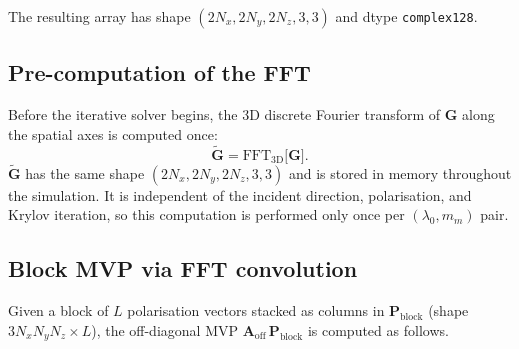 \documentclass[11pt,a4paper]{article}
\begin{document}
The resulting array has shape
$(2N_x, 2N_y, 2N_z, 3, 3)$ and dtype \texttt{complex128}.

\subsection{Pre-computation of the FFT}
\label{sec:fft-precompute}

Before the iterative solver begins, the 3D discrete Fourier transform of
$\mathbf{G}$ along the spatial axes is computed once:
\begin{equation}
  \widetilde{\mathbf{G}}
    = \mathrm{FFT}_{3\text{D}}\!\bigl[\mathbf{G}\bigr].
  \label{eq:fft-precompute}
\end{equation}
$\widetilde{\mathbf{G}}$ has the same shape
$(2N_x, 2N_y, 2N_z, 3, 3)$ and is stored in memory throughout the
simulation.
It is independent of the incident direction, polarisation, and Krylov
iteration, so this computation is performed only once per
$(\lambda_0, m_m)$ pair.

\subsection{Block MVP via FFT convolution}
\label{sec:fft-mvp}

Given a block of $L$ polarisation vectors stacked as columns in
$\mathbf{P}_{\text{block}}$ (shape $3N_xN_yN_z \times L$), the
off-diagonal MVP $\mathbf{A}_{\text{off}} \, \mathbf{P}_{\text{block}}$
is computed as follows.
\end{document}
